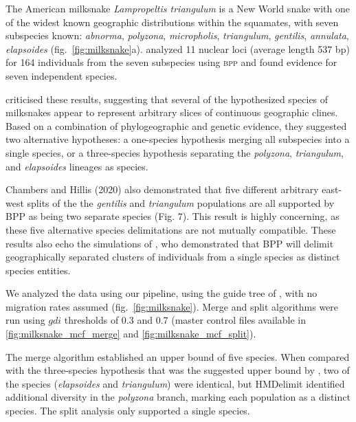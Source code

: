 \documentclass[A4]{article1}
\begin{document}
The  American milksnake \textit{Lampropeltis triangulum} is a New World snake with one of
the widest known geographic distributions within the squamates, with seven subspecies
known: \textit{abnorma}, \textit{polyzona}, \textit{micropholis}, \textit{triangulum},
\textit{gentilis}, \textit{annulata}, \textit{elapsoides} (fig.~\ref{fig:milksnake}a).  
\citet{Ruane2014} analyzed 11 nuclear loci (average length 537 bp) for 164 individuals
from the seven subspecies using \textsc{bpp} and found evidence for seven independent
species. 

\citet{Chambers2020} criticised these results, suggesting that several of the
hypothesized species of milksnakes appear to represent arbitrary slices of continuous
geographic clines.  Based on a combination of phylogeographic and genetic evidence, they
suggested two alternative hypotheses: a one-species hypothesis merging all subspecies into
a single species, or a three-species hypothesis separating the \textit{polyzona},
\textit{triangulum}, and \textit{elapsoides} lineages as species. 

Chambers and Hillis (2020) also demonstrated that
five different arbitrary east-west splits of the the
\textit{gentilis} and \textit{ triangulum} populations are all supported
by BPP as being two separate species (Fig. 7). This
result is highly concerning, as these five alternative
species delimitations are not mutually compatible.
These results also echo the simulations of \cite{Barley2018}, who demonstrated that BPP will delimit
geographically separated clusters of individuals from
a single species as distinct species entities.

We analyzed the data using our pipeline, using the guide tree of \citet{Chambers2020}, with no migration
rates assumed (fig.~\ref{fig:milksnake}).  Merge and split algorithms were run using $gdi$
thresholds of 0.3 and 0.7 (master control files available in \ref{fig:milksnake_mcf_merge} and \ref{fig:milksnake_mcf_split}).

The merge algorithm established an upper bound of five species.  When compared with the
three-species hypothesis that was the suggested upper bound by \citet{Chambers2020}, two
of the species (\textit{elapsoides} and \textit{triangulum}) were identical, but
HMDelimit identified additional diversity in the \textit{polyzona} branch, marking each
population as a distinct species.  The split analysis only supported a single species.
\end{document}
